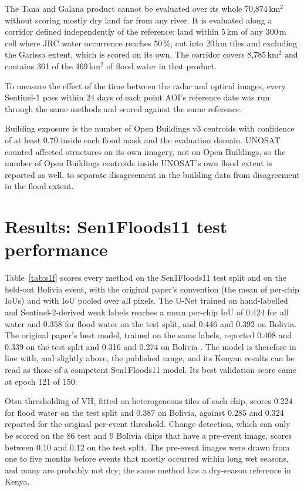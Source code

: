 \documentclass[11pt]{article}
\begin{document}
The Tana and Galana product cannot be evaluated over its whole 70,874\,km$^2$
without scoring mostly dry land far from any river. It is evaluated along a
corridor defined independently of the reference: land within 5\,km of any
300\,m cell where JRC water occurrence reaches 50\,\%, cut into 20\,km tiles
and excluding the Garissa extent, which is scored on its own. The corridor
covers 8,785\,km$^2$ and contains 361 of the 469\,km$^2$ of flood water in
that product.

To measure the effect of the time between the radar and optical images, every
Sentinel-1 pass within 24 days of each point AOI's reference date was run
through the same methods and scored against the same reference.

Building exposure is the number of Open Buildings v3 centroids with confidence
of at least 0.70 inside each flood mask and the evaluation domain. UNOSAT
counted affected structures on its own imagery, not on Open Buildings, so the
number of Open Buildings centroids inside UNOSAT's own flood extent is reported
as well, to separate disagreement in the building data from disagreement in
the flood extent.

\section{Results: Sen1Floods11 test performance}
\label{sec:s1f}

Table~\ref{tab:s1f} scores every method on the Sen1Floods11 test split and on
the held-out Bolivia event, with the original paper's convention (the mean of
per-chip IoUs) and with IoU pooled over all pixels. The U-Net trained on
hand-labelled and Sentinel-2-derived weak labels reaches a mean per-chip IoU
of 0.424 for all water and 0.358 for flood water on the test split, and 0.446
and 0.392 on Bolivia. The original paper's best model, trained on the same
labels, reported 0.408 and 0.339 on the test split and 0.316 and 0.274 on
Bolivia \cite{bonafilia2020}. The model is therefore in line with, and
slightly above, the published range, and its Kenyan results can be read as
those of a competent Sen1Floods11 model. Its best validation score came at
epoch 121 of 150.

Otsu thresholding of VH, fitted on heterogeneous tiles of each chip, scores
0.224 for flood water on the test split and 0.387 on Bolivia, against 0.285
and 0.324 reported for the original per-event threshold. Change detection,
which can only be scored on the 86 test and 9 Bolivia chips that have a
pre-event image, scores between 0.10 and 0.12 on the test split. The
pre-event images were drawn from one to five months before events that mostly
occurred within long wet seasons, and many are probably not dry; the same
method has a dry-season reference in Kenya.
\end{document}
